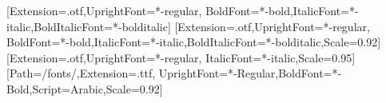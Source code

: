 %    
\usepackage{\ACNroot/templates/shared-style}
\usepackage[english]{babel}
\usepackage{microtype}

\setmainfont{texgyrepagella}[Extension=.otf,UprightFont=*-regular,
  BoldFont=*-bold,ItalicFont=*-italic,BoldItalicFont=*-bolditalic]
\setsansfont{texgyreheros}[Extension=.otf,UprightFont=*-regular,
  BoldFont=*-bold,ItalicFont=*-italic,BoldItalicFont=*-bolditalic,Scale=0.92]
\setmonofont{lmmono10}[Extension=.otf,UprightFont=*-regular,
  ItalicFont=*-italic,Scale=0.95]
\newfontfamily{}[Path=\ACNroot/fonts/,Extension=.ttf,
  UprightFont=*-Regular,BoldFont=*-Bold,Script=Arabic,Scale=0.92]
\linespread{1.08}

\newif\ifACNrtl \ACNrtlfalse
\renewcommand{\bil}[2]{#1}
\renewcommand{\ACNheadfont}{\sffamily}
\renewcommand{\ACNdispfont}{\sffamily}
\renewcommand{\ACNlatin}[1]{#1}
\newcommand{\ACNnodetext}[1]{#1}
\newcommand{\ACNothertext}[1]{\TeXXeTstate=1 \beginR #1\endR}
\newcommand{\ACNotherfont}{\ACNfaother}
\newcommand{\ACNalign}{left}
\newcommand{\ACNotheralign}{right}
\newcommand{\fa}[1]{{\ACNfaother\TeXXeTstate=1\beginR #1\endR}}





